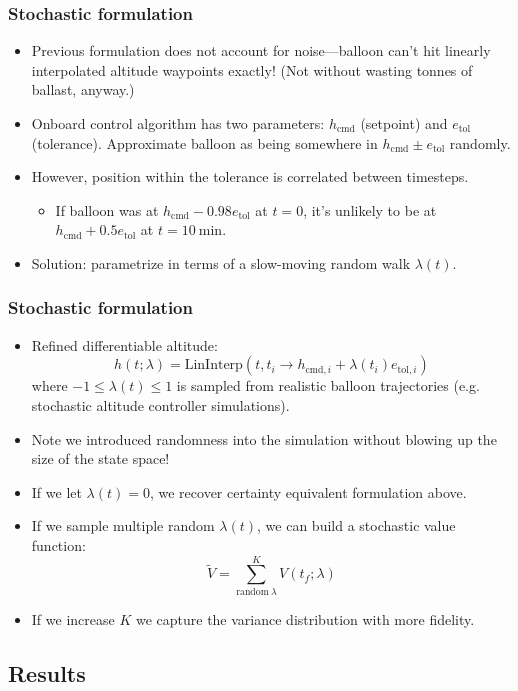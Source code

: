 \documentclass[10pt,mathserif]{beamer}
\begin{document}
\begin{frame}
\frametitle{Stochastic formulation}
\begin{itemize}
\item Previous formulation does not account for noise---balloon can't hit linearly interpolated altitude waypoints exactly! (Not without wasting tonnes of ballast, anyway.)
\item Onboard control algorithm has two parameters: $h_\text{cmd}$ (setpoint) and $e_\text{tol}$ (tolerance). Approximate balloon as being somewhere in $h_\text{cmd}\pm e_\text{tol}$ randomly.
\item However, position within the tolerance is correlated between timesteps.
\begin{itemize}
\item If balloon was at $h_\text{cmd} - 0.98e_\text{tol}$ at $t=0$, it's unlikely to be at $h_\text{cmd} + 0.5e_\text{tol}$ at $t=10~\text{min}$.
\end{itemize}
\item Solution: parametrize in terms of a slow-moving random walk $\lambda(t)$.
\end{itemize}
\end{frame}

\begin{frame}
\frametitle{Stochastic formulation}

\begin{itemize}
\item Refined differentiable altitude:
\[h(t; \lambda) =
\text{LinInterp}\left(t, t_i \to h_{\text{cmd},i} + \lambda(t_i) e_{\text{tol},i}\right)
\]
where $-1 \leq \lambda(t) \leq 1$ is sampled from realistic balloon trajectories (e.g. stochastic altitude controller simulations).
\item Note we introduced randomness into the simulation without blowing up the size of the state space!
\item If we let $\lambda(t)=0$, we recover certainty equivalent formulation above.
\item If we sample multiple random $\lambda(t)$, we can build a stochastic value function:
\[\tilde V = \sum_{\text{random}~\lambda}^K V(t_f; \lambda)\]
\item If we increase $K$ we capture the variance distribution with more fidelity.
\end{itemize}
\end{frame}


\subsection{Results}
\end{document}
